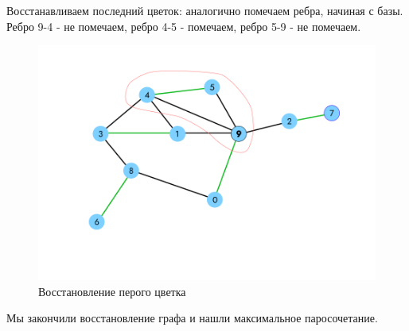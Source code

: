 \documentclass[14pt, a4paper]{extarticle}
\begin{document}
    \pagebreak

    Восстанавливаем последний цветок: аналогично помечаем ребра, начиная с базы. Ребро 9-4 - не помечаем, ребро 4-5 - помечаем, ребро 5-9 - не помечаем. 

    \begin{figure}[ht!]
        \centering
        \includegraphics[scale=0.3]{8.png}
        \caption{Восстановление перого цветка}
        \label{fig:my_label}
    \end{figure} 

    Мы закончили восстановление графа и нашли максимальное паросочетание.
    

    

    \printbibliography
    
\end{document}
